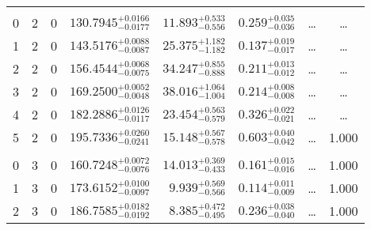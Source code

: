 \begin{table*}[!]
\begin{tabular}{llcrrlrc}
\hline \\[-8pt]
0 & 2 & 0 & $    130.7945_{-      0.0177}^{+      0.0166}$ & $      11.893_{-       0.556}^{+       0.533}$ & $       0.259_{-       0.036}^{+       0.035}$ & \multicolumn{1}{c}{\dots} & \dots \\[1pt]
1 & 2 & 0 & $    143.5176_{-      0.0087}^{+      0.0088}$ & $      25.375_{-       1.182}^{+       1.182}$ & $       0.137_{-       0.017}^{+       0.019}$ & \multicolumn{1}{c}{\dots} & \dots \\[1pt]
2 & 2 & 0 & $    156.4544_{-      0.0075}^{+      0.0068}$ & $      34.247_{-       0.888}^{+       0.855}$ & $       0.211_{-       0.012}^{+       0.013}$ & \multicolumn{1}{c}{\dots} & \dots \\[1pt]
3 & 2 & 0 & $    169.2500_{-      0.0048}^{+      0.0052}$ & $      38.016_{-       1.004}^{+       1.064}$ & $       0.214_{-       0.008}^{+       0.008}$ & \multicolumn{1}{c}{\dots} & \dots \\[1pt]
4 & 2 & 0 & $    182.2886_{-      0.0117}^{+      0.0126}$ & $      23.454_{-       0.579}^{+       0.563}$ & $       0.326_{-       0.021}^{+       0.022}$ & \multicolumn{1}{c}{\dots} & \dots \\[1pt]
5 & 2 & 0 & $    195.7336_{-      0.0241}^{+      0.0260}$ & $      15.148_{-       0.578}^{+       0.567}$ & $       0.603_{-       0.042}^{+       0.040}$ & \multicolumn{1}{c}{\dots} & 1.000 \\[1pt]
\hline \\[-8pt]
 0  & 3 & 0 & $    160.7248_{-      0.0076}^{+      0.0072}$ & $      14.013_{-       0.433}^{+       0.369}$ & $       0.161_{-       0.016}^{+       0.015}$ & \multicolumn{1}{c}{\dots} & 1.000\\[1pt]
1  & 3 & 0 & $    173.6152_{-      0.0097}^{+      0.0100}$ & $       9.939_{-       0.566}^{+       0.569}$ & $       0.114_{-       0.009}^{+       0.011}$ & \multicolumn{1}{c}{\dots} & 1.000\\[1pt]
2 & 3 & 0 & $    186.7585_{-      0.0192}^{+      0.0182}$ & $       8.385_{-       0.495}^{+       0.472}$ & $       0.236_{-       0.040}^{+       0.038}$ & \multicolumn{1}{c}{\dots} & 1.000\\[1pt]
\hline
\end{tabular}
\end{table*}